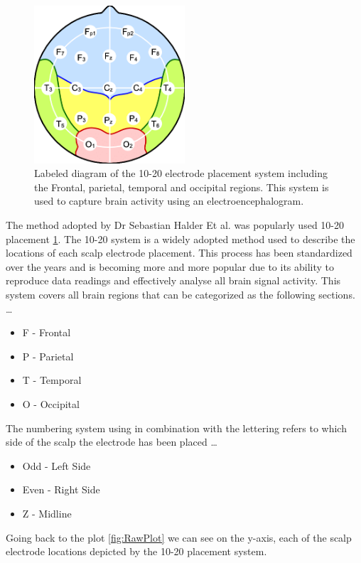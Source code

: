 \documentclass[12pt]{article}
\begin{document}
\begin{figure}[tb]
\centering
\includegraphics[width=0.5\textwidth]{ElectrodePlacementDiagram.png}
\caption{\label{fig:ECD}Labeled diagram of the 10-20 electrode placement system including the Frontal, parietal, temporal and occipital regions. This system is used to capture brain activity using an electroencephalogram.}
\end{figure} 

The method adopted by Dr Sebastian Halder Et al. was popularly used 10-20 placement \ref{fig:ECD}. The 10-20 system is a widely adopted method used to describe the locations of each scalp electrode placement. This process has been standardized over the years and is becoming more and more popular due to its ability to reproduce data readings and effectively analyse all brain signal activity. This system covers all brain regions that can be categorized as the following sections.
\dots
\begin{itemize}
\item F - Frontal
\item P - Parietal
\item T - Temporal
\item O - Occipital 
\end{itemize}
The numbering system using in combination with the lettering refers to which side of the scalp the electrode has been placed 
\dots
\begin{itemize}
\item Odd - Left Side
\item Even - Right Side
\item Z - Midline
\end{itemize}
Going back to the plot \ref{fig:RawPlot} we can see on the y-axis, each of the scalp electrode locations depicted by the 10-20 placement system.
\end{document}

